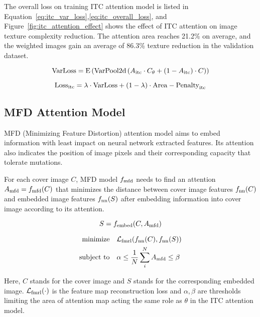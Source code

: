 The overall loss on training ITC attention model is listed in Equation~\ref{eq:itc_var_loss},\ref{eq:itc_overall_loss}, and Figure~\ref{fig:itc_attention_effect} shows the effect of ITC attention on image texture complexity reduction. The attention area reaches 21.2\% on average, and the weighted images gain an average of 86.3\% texture reduction in the validation dataset.

\begin{equation}
  \mathrm{VarLoss} = \mathrm{E} \left( \mathrm{VarPool2d} \left( A_{\text{itc}} \cdot C_{\theta} + (1 - A_{\text{itc}}) \cdot C \right) \right)
  \label{eq:itc_var_loss}
\end{equation}

\begin{equation}
  \mathrm{Loss}_{\text{itc}} = \lambda \cdot \text{VarLoss} + (1 - \lambda) \cdot \mathrm{Area-Penalty}_{\text{itc}}
  \label{eq:itc_overall_loss}
\end{equation}

\subsection{MFD Attention Model}
MFD (Minimizing Feature Distortion) attention model aims to embed information with least impact on neural network extracted features. Its attention also indicates the position of image pixels and their corresponding capacity that tolerate mutations.

For each cover image \(C\), MFD model \(f_{\text{mfd}}\) needs to find an attention \(A_{\text{mfd}} = f_{\text{mfd}}(C)\) that minimizes the distance between cover image features \(f_{\text{nn}}(C)\) and embedded image features \(f_{\text{nn}}(S)\) after embedding information into cover image according to its attention.

\begin{equation}
  S = f_{\text{embed}}(C, A_{\text{mfd}})
\end{equation}

\begin{align}
  \text{minimize}   \quad & \mathcal{L}_\mathrm{fmrl}(f_{\text{nn}}(C), f_{\text{nn}}(S)) \\
  \text{subject to} \quad & \alpha \leq \frac{1}{N} \sum_{i}^{N} A_{\text{mfd}} \leq \beta
\end{align}

Here, \(C\) stands for the cover image and \(S\) stands for the corresponding embedded image. \(\mathcal{L}_\mathrm{fmrl}(\cdot)\) is the feature map reconstruction loss and \( \alpha, \beta \) are thresholds limiting the area of attention map acting the same role as \( \theta \) in the ITC attention model.

